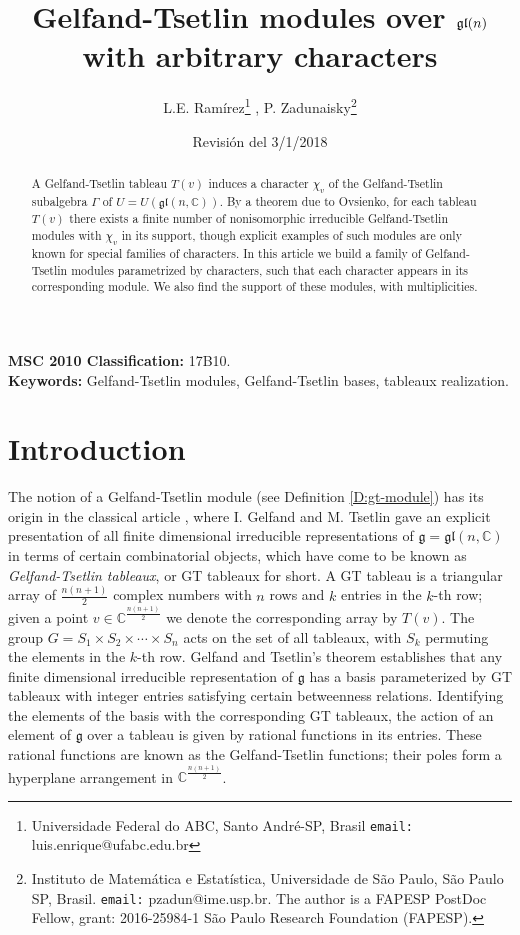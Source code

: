 \documentclass[11pt,fleqn]{article}
\title{Gelfand-Tsetlin modules over $\gl(n)$ with arbitrary characters}
\author{L.E. Ram\'irez\footnote{Universidade Federal do ABC, Santo Andr\'e-SP, 
Brasil \texttt{email:} luis.enrique@ufabc.edu.br} , 
P. Zadunaisky\footnote{Instituto de Matem\'atica e Estat\'istica, Universidade 
de S\~ao Paulo,  S\~ao Paulo SP, Brasil. \texttt{email:} pzadun@ime.usp.br.
The author is a FAPESP PostDoc Fellow, grant: 2016-25984-1 
S\~ao Paulo Research Foundation (FAPESP).}
}
\date{Revisión del 3/1/2018}
\newcommand\CC{\mathbb C}
\newcommand\g{\mathfrak g}
\newcommand\gl{\mathfrak{gl}}
\begin{document}
\maketitle

\begin{abstract}
A Gelfand-Tsetlin tableau $T(v)$ induces a character $\chi_v$ of the 
Gelfand-Tsetlin subalgebra $\Gamma$ of $U = U(\gl(n,\CC))$. By a theorem due 
to Ovsienko, for each tableau $T(v)$ there exists a finite number of 
nonisomorphic irreducible Gelfand-Tsetlin modules with $\chi_v$ in its 
support, though explicit examples of such modules are only known for special
families of characters. In this article we build a family of Gelfand-Tsetlin
modules parametrized by characters, such that each character appears in its
corresponding module. We also find the support of these modules, with 
multiplicities.
\end{abstract}
\noindent\textbf{MSC 2010 Classification:} 17B10.\\
\noindent\textbf{Keywords:} Gelfand-Tsetlin modules, Gelfand-Tsetlin bases,
tableaux realization.

\section{Introduction}
The notion of a Gelfand-Tsetlin module (see Definition \ref{D:gt-module}) has 
its origin in the classical article \cite{GT-modules}, where I. Gelfand and M. 
Tsetlin gave an explicit presentation of all finite dimensional irreducible 
representations of $\g = \gl(n,\CC)$ in terms of certain combinatorial 
objects, which have come to be known as \emph{Gelfand-Tsetlin tableaux}, or 
GT tableaux for short. A GT tableau is a triangular array of $\frac{n(n+1)}{2}$
complex numbers with $n$ rows and $k$ entries in the $k$-th row; given a point 
$v \in \CC^{\frac{n(n+1)}{2}}$ we denote the corresponding array by $T(v)$. 
The group 
$G = S_1 \times S_2 \times \cdots \times S_n$ acts on the set of all tableaux, 
with $S_k$ permuting the elements in the $k$-th row. Gelfand and Tsetlin's
theorem establishes that any finite dimensional irreducible representation of 
$\g$ has a basis parameterized by GT tableaux with integer entries satisfying 
certain betweenness relations. Identifying the elements of the basis with the 
corresponding GT tableaux, the action of an element of $\g$ over a 
tableau is given by rational functions in its entries. These rational 
functions are known as the Gelfand-Tsetlin functions; their poles form a 
hyperplane arrangement in $\CC^{\frac{n(n+1)}{2}}$.
\end{document}
